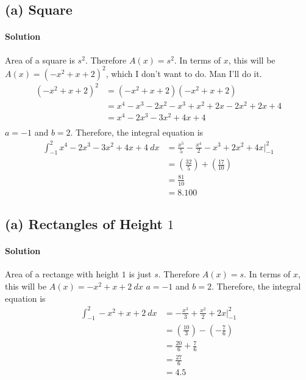 \documentclass[letterpaper, 12pt]{article}
\begin{document}
\subsection{(a) Square}
\paragraph{Solution} Area of a square is $s^2$. Therefore $A(x)=s^2$. In terms of $x$, this will be $A(x)=(-x^2+x+2)^2$, which I don't want to do. Man I'll do it.
\begin{align}
    (-x^2+x+2)^2 & =(-x^2+x+2)(-x^2+x+2)               \\
                 & = x^4-x^3-2x^2-x^3+x^2+2x-2x^2+2x+4 \\
                 & = x^4-2x^3-3x^2+4x+4                \\
\end{align}
$a=-1$ and $b=2$. Therefore, the integral equation is
\begin{align}
    \int_{-1}^{2}x^4-2x^3-3x^2+4x+4\:dx & =\frac{x^5}{5}-\frac{x^4}{2}-x^3+2x^2+4x\Big|_{-1}^{2} \\
                                        & =(\frac{32}{5})+(\frac{17}{10})                        \\
                                        & =\frac{81}{10}                                         \\
                                        & =\boxed{8.100}
\end{align}
\subsection{(a) Rectangles of Height $1$}
\paragraph{Solution} Area of a rectange with height $1$ is just $s$. Therefore $A(x)=s$. In terms of $x$, this will be $A(x)=-x^2+x+2\:dx$
$a=-1$ and $b=2$. Therefore, the integral equation is
\begin{align}
    \int_{-1}^{2}-x^2+x+2\:dx & =-\frac{x^3}{3}+\frac{x^2}{2}+2x\Big|_{-1}^{2} \\
                              & = (\frac{10}{3})-(-\frac{7}{6})                \\
                              & = \frac{20}{6}+\frac{7}{6}                     \\
                              & = \frac{27}{6}                                 \\
                              & = \boxed{4.5}
\end{align}
\subsection{}
\end{document}

